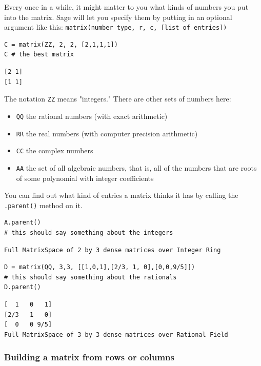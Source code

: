 \documentclass[10pt,]{book}
\theoremstyle{plain}
\numberwithin{equation}{section}
\begin{document}
        Every once in a while, it might matter to you what kinds of numbers you
        put into the matrix. Sage will let you specify them by putting in an optional
        argument like this: \verb?matrix(number type, r, c, [list of entries])?
\begin{lstlisting}[style=sageinput]
C = matrix(ZZ, 2, 2, [2,1,1,1])
C # the best matrix
\end{lstlisting}
\begin{lstlisting}[style=sageoutput]
[2 1]
[1 1]
\end{lstlisting}
\par

        The notation \verb?ZZ? means "integers." There are other sets of numbers
        here:
        \begin{itemize}
\item{}\verb?QQ? the rational numbers (with exact arithmetic)\item{}\verb?RR? the real numbers (with computer precision arithmetic)\item{}\verb?CC? the complex numbers\item{}\verb?AA? the set of all algebraic numbers, that is, all of the
            numbers that are roots of some polynomial with integer coefficients
          \end{itemize}

        You can find out what kind of entries a matrix thinks it has by calling the
        \verb?.parent()? method on it.
\begin{lstlisting}[style=sageinput]
A.parent()
# this should say something about the integers
\end{lstlisting}
\begin{lstlisting}[style=sageoutput]
Full MatrixSpace of 2 by 3 dense matrices over Integer Ring
\end{lstlisting}
\begin{lstlisting}[style=sageinput]
D = matrix(QQ, 3,3, [[1,0,1],[2/3, 1, 0],[0,0,9/5]])
# this should say something about the rationals
D.parent()
\end{lstlisting}
\begin{lstlisting}[style=sageoutput]
[  1   0   1]
[2/3   1   0]
[  0   0 9/5]
Full MatrixSpace of 3 by 3 dense matrices over Rational Field
\end{lstlisting}
\typeout{************************************************}
\typeout{************************************************}
\subsubsection[Building a matrix from rows or columns]{Building a matrix from rows or columns}\label{subsubsection-8}
\end{document}
